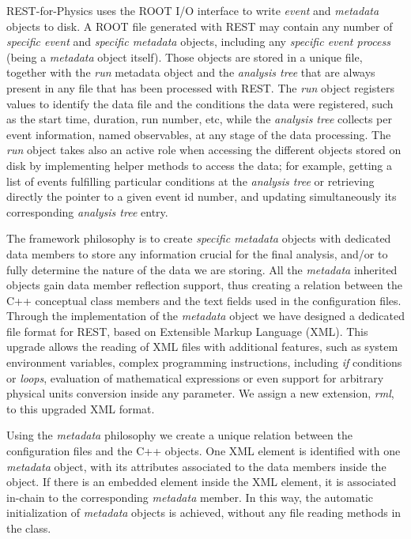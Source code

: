 REST-for-Physics uses the ROOT I/O interface to write \emph{event} and \emph{metadata} objects to disk. A ROOT file generated with REST may contain any number of \emph{specific event} and \emph{specific metadata} objects, including any \emph{specific event process} (being a \emph{metadata} object itself). Those objects are stored in a unique file, together with the \emph{run} metadata object and the \emph{analysis tree} that are always present in any file that has been processed with REST. The \emph{run} object registers values to identify the data file and the conditions the data were registered, such as the start time, duration, run number, etc, while the \emph{analysis tree} collects per event information, named observables, at any stage of the data processing. The \emph{run} object takes also an active role when accessing the different objects stored on disk by implementing helper methods to access the data; for example, getting a list of events fulfilling particular conditions at the \emph{analysis tree} or retrieving directly the pointer to a given event id number, and updating simultaneously its corresponding \emph{analysis tree} entry.

The framework philosophy is to create \emph{specific metadata} objects with dedicated data members to store any information crucial for the final analysis, and/or to fully determine the nature of the data we are storing. All the \emph{metadata} inherited objects gain data member reflection support, thus creating a relation between the C++ conceptual class members and the text fields used in the configuration files. Through the implementation of the \emph{metadata} object we have designed a dedicated file format for REST, based on Extensible Markup Language (XML). This upgrade allows the reading of XML files with additional features, such as system environment variables, complex programming instructions, including \emph{if} conditions or \emph{loops}, evaluation of mathematical expressions or even support for arbitrary physical units conversion inside any parameter. We assign a new extension, \emph{rml}, to this upgraded XML format.

Using the \emph{metadata} philosophy we create a unique relation between the configuration files and the C++ objects. One XML element is identified with one \emph{metadata} object, with its attributes associated to the data members inside the object. If there is an embedded element inside the XML element, it is associated in-chain to the corresponding \emph{metadata} member. In this way, the automatic initialization of \emph{metadata} objects is achieved, without any file reading methods in the class.

